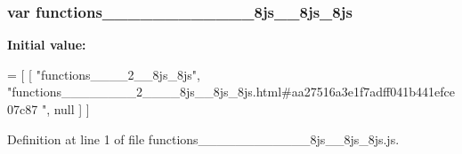 \subsubsection[{functions\+\_\+\+\_\+\+\_\+\+\_\+\+\_\+\+\_\+\+\_\+\+\_\+2\+\_\+\+\_\+\+\_\+\+\_\+8js\+\_\+\+\_\+8js\+\_\+8js}]{\setlength{\rightskip}{0pt plus 5cm}var functions\+\_\+\+\_\+\+\_\+\+\_\+\+\_\+\+\_\+\+\_\+\+\_\+\_\+\+\_\+\+\_\+\+\_\+8js\+\_\+\+\_\+8js\+\_\+8js}\label{functions________________2________8js____8js__8js_8js_a5d6ef7f2c3943e0582245df3baed1377}
{\bfseries Initial value\+:}
\begin{DoxyCode}
=
[
    [ \textcolor{stringliteral}{"functions\_\_\_\_2\_\_8js\_8js"}, \textcolor{stringliteral}{"functions\_\_\_\_\_\_\_\_2\_\_\_\_8js\_\_8js\_8js.html#aa27516a3e1f7adff041b441efce07c87
      "}, null ]
]
\end{DoxyCode}


Definition at line 1 of file functions\+\_\+\+\_\+\+\_\+\+\_\+\+\_\+\+\_\+\+\_\+\+\_\+\_\+\+\_\+\+\_\+\+\_\+8js\+\_\+\+\_\+8js\+\_\+8js.\+js.

